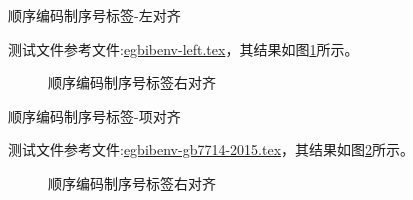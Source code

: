 顺序编码制序号标签-左对齐

测试文件参考文件:\href{run:./egbibenv-left.tex}{egbibenv-left.tex}，其结果如图\ref{bib:env:left}所示。
\begin{figure}[!htb]
  \centering
  \caption{顺序编码制序号标签右对齐}\label{bib:env:left}
\end{figure}

顺序编码制序号标签-项对齐

测试文件参考文件:\href{run:./egbibenv-gb7714-2015.tex}{egbibenv-gb7714-2015.tex}，其结果如图\ref{bib:env:gb}所示。
\begin{figure}[!htb]
  \centering
  \caption{顺序编码制序号标签右对齐}\label{bib:env:gb}
\end{figure}

